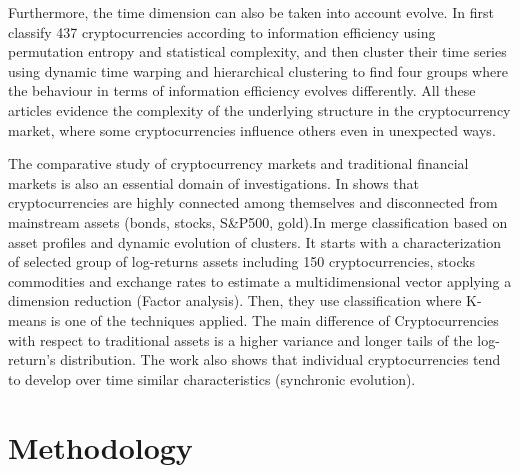 \documentclass{bmcart}
\begin{document}
Furthermore, the time dimension can also be taken into account evolve. In \cite{HigorSigakiClusteringPattersCrypto2018}  first classify 437 cryptocurrencies according to information efficiency using permutation entropy and statistical complexity, and then cluster their time series using dynamic time warping and hierarchical clustering to find four groups where the behaviour in terms of information efficiency evolves differently. All these articles evidence the complexity of the underlying structure in the cryptocurrency market, where some cryptocurrencies influence others even in unexpected ways. 

The comparative study of  cryptocurrency markets and traditional financial markets is also an essential domain of investigations. In \cite{CryptoDynamicRelationships2018} shows that cryptocurrencies are highly connected among themselves and disconnected from mainstream assets (bonds, stocks, S\&P500, gold).In \cite{Pele2020} merge classification based on asset profiles and dynamic evolution of clusters. It starts with a characterization of selected group of log-returns assets including 150 cryptocurrencies, stocks commodities and exchange rates to estimate a multidimensional vector applying a dimension reduction (Factor analysis). Then, they use  classification where K-means is one of the techniques applied. The main difference of Cryptocurrencies with respect to traditional assets is a higher variance and longer tails of the log-return's distribution. The work also shows that individual cryptocurrencies tend to develop over time similar characteristics (synchronic evolution).


\section*{Methodology}
\end{document}

